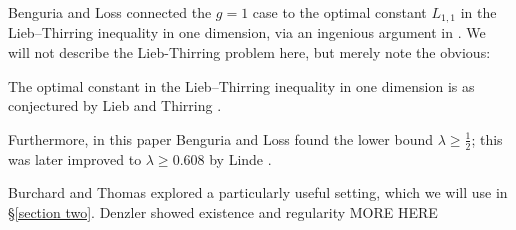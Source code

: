 Benguria and Loss connected the $g=1$ case  to the optimal constant $L_{1,1}$ in the Lieb--Thirring inequality in one dimension, via an ingenious argument in  \cite{benguria2004connection}.
We will not describe the Lieb-Thirring problem here, but merely note the obvious:
\begin{cor}  The optimal constant in the Lieb--Thirring inequality in one dimension is as conjectured by Lieb and Thirring  \cite{lieb1976inequalities}.
\end{cor}
Furthermore, in this paper Benguria and Loss found the lower bound $\lambda\ge \frac12$;  this was later improved to $\lambda\ge 0.608$ by Linde \cite{linde2006lower}.   

Burchard and Thomas \cite{burchard2005isoperimetric} explored a particularly useful setting, which we will use in \S\ref{section two}.
Denzler showed existence and regularity \cite{denzler2015existence}  MORE HERE

%


